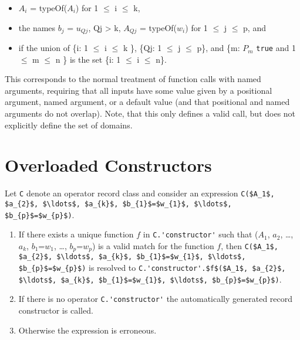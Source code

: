 \begin{itemize}
\item
  $A_{i}$ = typeOf($A_{i}$) for 1 $\le$ i $\le$ k,
\item
  the names $b_{j}$ = $u_{Qj}$, Qj \textgreater{}
  k, $A_{Qj}$ = typeOf($w_{i}$) for 1 $\le$ j $\le$ p, and
\item
  if the union of \{i: 1 $\le$ i $\le$ k \}, \{Qj: 1 $\le$ j $\le$ p\}, and \{m:
  $P_{m}$ \lstinline!true! and 1 $\le$ m $\le$ n \} is the set \{i: 1 $\le$
  i $\le$ n\}.
\end{itemize}

\begin{nonnormative}
This corresponds to the normal treatment of function calls with
named arguments, requiring that all inputs have some value given by a
positional argument, named argument, or a default value (and that
positional and named arguments do not overlap). Note, that this only
defines a valid call, but does not explicitly define the set of
domains.
\end{nonnormative}

\section{Overloaded Constructors}\label{overloaded-constructors}

Let \lstinline!C! denote an operator record class and consider an expression
\lstinline!C($A_1$, $a_{2}$, $\ldots$, $a_{k}$, $b_{1}$=$w_{1}$, $\ldots$, $b_{p}$=$w_{p}$)!.

\begin{enumerate}
\item\label{overloaded-constructor-unique}
  If there exists a unique function $f$ in \lstinline!C.'constructor'! such that
  ($A_1$, $a_{2}$, \ldots{}, $a_{k}$, $b_{1}$=$w_{1}$, \ldots{}, $b_{p}$=$w_{p}$)
  is a valid match for the function $f$, then
  \lstinline!C($A_1$, $a_{2}$, $\ldots$, $a_{k}$, $b_{1}$=$w_{1}$, $\ldots$, $b_{p}$=$w_{p}$)!
  is resolved to
  \lstinline!C.'constructor'.$f$($A_1$, $a_{2}$, $\ldots$, $a_{k}$, $b_{1}$=$w_{1}$, $\ldots$, $b_{p}$=$w_{p}$)!.
\item
  If there is no operator \lstinline!C.'constructor'! the automatically generated record constructor is called.
\item
  Otherwise the expression is erroneous.
\end{enumerate}

